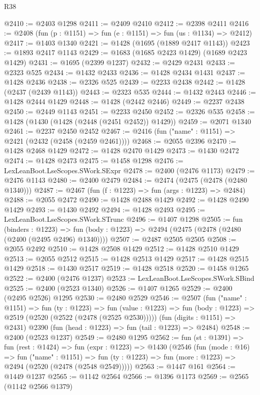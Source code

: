 \begin{lexlean}{R38}
\begin{coremodule}
@2410 := @2403 @1298
@2411 := @2409 @2410
@2412 := @2398 @2411
@2416 := @2408 (fun (p : @1151) => fun (e : @1151) => fun (us : @1134) => @2412)
@2417 := @1403 @1340
@2421 := @1428 (@1695 (@1889 @2417 @1143))
@2423 := @1893 @2417 @1143
@2429 := @1683 (@1685 @2423 @1429) (@1689 @2423 @1429)
@2431 := @1695 (@2399 @1237)
@2432 := @2429 @2431
@2433 := @2323 @525
@2434 := @1432 @2433
@2436 := @1428 @2434 @1431
@2437 := @1428 @2436
@2438 := @2326 @525
@2439 := @2233 @2438
@2442 := @1428 (@2437 (@2439 @1143))
@2443 := @2323 @535
@2444 := @1432 @2443
@2446 := @1428 @2444 @1429
@2448 := @1428 (@2442 @2446)
@2449 := @2237 @2438
@2450 := @2449 @1143
@2451 := @2233 @2450
@2452 := @2326 @535
@2458 := @1428 (@1430 (@1428 (@2448 (@2451 @2452)) @1429))
@2459 := @2071 @1340
@2461 := @2237 @2450 @2452
@2467 := @2416 (fun ("name" : @1151) => @2421 (@2432 (@2458 (@2459 @2461))))
@2468 := @2055 @2396
@2470 := @1428 @2468 @1429
@2472 := @1428 @2470 @1429
@2473 := @1430 @2472
@2474 := @1428 @2473
@2475 := @1458 @1298
@2476 := LexLeanBoot.LseScopes.SWork.SExpr
@2478 := @2400 (@2476 @1173)
@2479 := @2476 @1143
@2480 := @2400 @2479
@2484 := @2474 (@2475 (@2478 (@2480 @1340)))
@2487 := @2467 (fun (f : @1223) => fun (args : @1223) => @2484)
@2488 := @2055 @2472
@2490 := @1428 @2488 @1429
@2492 := @1428 @2490 @1429
@2493 := @1430 @2492
@2494 := @1428 @2493
@2495 := LexLeanBoot.LseScopes.SWork.STrunc
@2496 := @1407 @1298
@2505 := fun (binders : @1223) =>
  fun (body : @1223) => @2494 (@2475 (@2478 (@2480 (@2400 (@2495 @2496) @1340))))
@2507 := @2487 @2505 @2505
@2508 := @2055 @2492
@2510 := @1428 @2508 @1429
@2512 := @1428 @2510 @1429
@2513 := @2055 @2512
@2515 := @1428 @2513 @1429
@2517 := @1428 @2515 @1429
@2518 := @1430 @2517
@2519 := @1428 @2518
@2520 := @1458 @1265
@2522 := @2400 (@2476 @1237)
@2523 := LexLeanBoot.LseScopes.SWork.SBind
@2525 := @2400 (@2523 @1340)
@2526 := @1407 @1265
@2529 := @2400 (@2495 @2526) @1295
@2530 := @2480 @2529
@2546 := @2507
    (fun ("name" : @1151) =>
    fun (ty : @1223) =>
    fun (value : @1223) => fun (body : @1223) => @2519 (@2520 (@2522 (@2478 (@2525 @2530)))))
    (fun (digits : @1151) => @2431)
    @2390
    (fun (head : @1223) => fun (tail : @1223) => @2484)
@2548 := @2400 (@2523 @1237)
@2549 := @2480 @1295
@2562 := fun (st : @1391) =>
  fun (rest : @1424) =>
  fun (expr : @1223) =>
  @1430
    (@2546
      (fun (mode : @16) =>
      fun ("name" : @1151) =>
      fun (ty : @1223) => fun (more : @1223) => @2494 (@2520 (@2478 (@2548 @2549)))))
@2563 := @1447 @161
@2564 := @1449 @1237
@2565 := @1142 @2564
@2566 := @1396 @1173
@2569 := @2565 (@1142 @2566 @1379)

\end{coremodule}
\end{lexlean}
